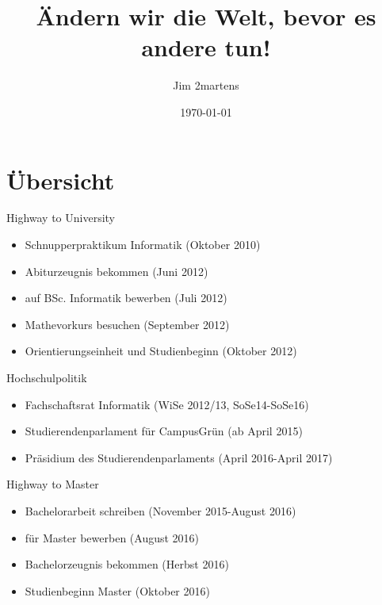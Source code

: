 \documentclass{beamer}
\begin{document}
\author{Jim 2martens}
\title{Ändern wir die Welt, bevor es andere tun!}
\date{\today}

\begin{frame}
    \titlepage
\end{frame}

\begin{frame}
    \tableofcontents
\end{frame}

\section{Übersicht}
\begin{frame}{Highway to University}
    \begin{itemize}
        \item Schnupperpraktikum Informatik (Oktober 2010)
        \vfill
        \item Abiturzeugnis bekommen (Juni 2012)
        \vfill
        \item auf BSc. Informatik bewerben (Juli 2012)
        \vfill
        \item Mathevorkurs besuchen (September 2012)
        \vfill
        \item Orientierungseinheit und Studienbeginn (Oktober 2012)
    \end{itemize}
\end{frame}

\begin{frame}{Hochschulpolitik}
    \begin{itemize}
        \item Fachschaftsrat Informatik (WiSe 2012/13, SoSe14-SoSe16)
        \vfill
        \item Studierendenparlament für CampusGrün (ab April 2015)
        \vfill
        \item Präsidium des Studierendenparlaments (April 2016-April 2017)
    \end{itemize}
\end{frame}

\begin{frame}{Highway to Master}
    \begin{itemize}
        \item Bachelorarbeit schreiben (November 2015-August 2016)
        \vfill
        \item für Master bewerben (August 2016)
        \vfill
        \item Bachelorzeugnis bekommen (Herbst 2016)
        \vfill
        \item Studienbeginn Master (Oktober 2016)
    \end{itemize}
\end{frame}
\end{document}

